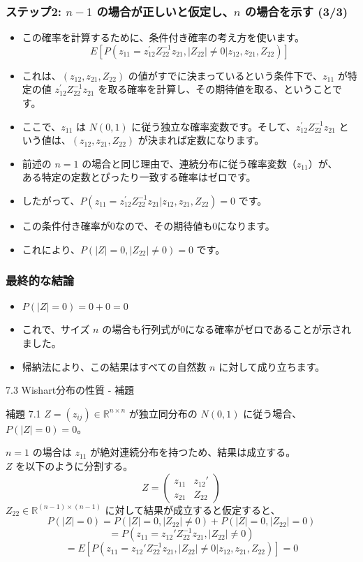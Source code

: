 \documentclass{beamer}
\begin{document}
\begin{frame}
\frametitle{ステップ2: $n-1$ の場合が正しいと仮定し、$n$ の場合を示す (3/3)}
\begin{itemize}
    \item この確率を計算するために、条件付き確率の考え方を使います。
    \[ E[P(z_{11}=z_{12}^{\prime}Z_{22}^{-1}z_{21},|Z_{22}|\ne0|z_{12},z_{21},Z_{22})] \]
    \item これは、$(z_{12},z_{21},Z_{22})$ の値がすでに決まっているという条件下で、$z_{11}$ が特定の値 $z_{12}^{\prime}Z_{22}^{-1}z_{21}$ を取る確率を計算し、その期待値を取る、ということです。
    \item ここで、$z_{11}$ は $N(0,1)$ に従う独立な確率変数です。そして、$z_{12}^{\prime}Z_{22}^{-1}z_{21}$ という値は、$(z_{12},z_{21},Z_{22})$ が決まれば定数になります。
    \item 前述の $n=1$ の場合と同じ理由で、連続分布に従う確率変数（$z_{11}$）が、\\ある特定の定数とぴったり一致する確率はゼロです。
    \item したがって、$P(z_{11}=z_{12}^{\prime}Z_{22}^{-1}z_{21}|z_{12},z_{21},Z_{22})=0$ です。
    \item この条件付き確率が0なので、その期待値も0になります。
    \item これにより、$P(|Z|=0,|Z_{22}|\ne0)=0$ です。
\end{itemize}
\end{frame}

\begin{frame}
\frametitle{最終的な結論}
\begin{itemize}
    \item $P(|Z|=0)=0+0=0$
    \item これで、サイズ $n$ の場合も行列式が0になる確率がゼロであることが示されました。
    \item 帰納法により、この結果はすべての自然数 $n$ に対して成り立ちます。
\end{itemize}
\end{frame}


\begin{frame}{7.3 Wishart分布の性質 - 補題}
\begin{block}{補題 7.1}
$Z = (z_{ij}) \in \mathbb{R}^{n \times n}$ が独立同分布の $N(0, 1)$ に従う場合、$P(|Z| = 0) = 0$。
\end{block}

$n=1$ の場合は $z_{11}$ が絶対連続分布を持つため、結果は成立する。\\
$Z$ を以下のように分割する。
\[
Z = \begin{pmatrix} z_{11} & z_{12}' \\ z_{21} & Z_{22} \end{pmatrix}
\]
$Z_{22} \in \mathbb{R}^{(n-1) \times (n-1)}$ に対して結果が成立すると仮定すると、
\[
P(|Z|=0) = P(|Z|=0, |Z_{22}| \ne 0) + P(|Z|=0, |Z_{22}|=0)
\]
\[
= P(z_{11} = z_{12}'Z_{22}^{-1}z_{21}, |Z_{22}| \ne 0)
\]
\[
= E[P(z_{11} = z_{12}'Z_{22}^{-1}z_{21}, |Z_{22}| \ne 0 | z_{12}, z_{21}, Z_{22})] = 0
\]
\end{frame}
\end{document}
